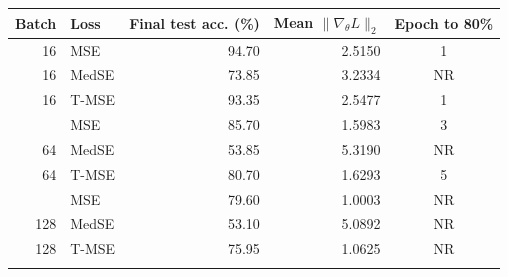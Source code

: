 \begin{tabular}{rlrrc}
\toprule
Batch & Loss & Final test acc. (\%) & Mean $\|\nabla_\theta L\|_2$ & Epoch to 80\% \\
\midrule
16 & MSE & 94.70 & 2.5150 & 1 \\
16 & MedSE & 73.85 & 3.2334 & NR \\
16 & T-MSE & 93.35 & 2.5477 & 1 \\
\addlinespace
64 & MSE & 85.70 & 1.5983 & 3 \\
64 & MedSE & 53.85 & 5.3190 & NR \\
64 & T-MSE & 80.70 & 1.6293 & 5 \\
\addlinespace
128 & MSE & 79.60 & 1.0003 & NR \\
128 & MedSE & 53.10 & 5.0892 & NR \\
128 & T-MSE & 75.95 & 1.0625 & NR \\
\addlinespace
\bottomrule
\end{tabular}
